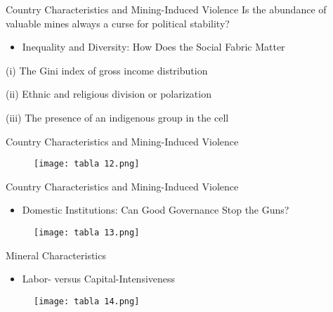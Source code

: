 \documentclass[pdftex,12pt,xcolor=pdftex,table]{beamer}
\theoremstyle{definition}
\theoremstyle{remark}
\numberwithin{equation}{section}
\numberwithin{figure}{section}
\begin{document}
    \begin{frame}{Country Characteristics and Mining-Induced Violence}
        \justifying
         Is the abundance of valuable mines always a curse for political stability?
        \begin{itemize}
          \item Inequality and Diversity: How Does the Social Fabric Matter
          \end{itemize}
          \vfill 
\item (i) The Gini index of gross income distribution
\item (ii) Ethnic and religious division or polarization
\item (iii) The presence of an indigenous group in the cell
          
    \end{frame}
    
    \begin{frame}{Country Characteristics and Mining-Induced Violence}
    \justifying
    \begin{figure}[H]
				\centering
				\texttt{[image: tabla 12.png]}
				
			\end{figure}
    
        \end{frame}
    
    \begin{frame}{Country Characteristics and Mining-Induced Violence}
        \justifying
        \begin{itemize}
        \item Domestic Institutions: Can Good Governance Stop the Guns?
        \end{itemize}
        \begin{figure}[H]
				\centering
				\texttt{[image: tabla 13.png]}
				
			\end{figure}
    
    
        \end{frame}
        
    \begin{frame}{Mineral Characteristics}
        \justifying
        \begin{itemize}
        \item Labor- versus Capital-Intensiveness
        \end{itemize}
        \begin{figure}[H]
				\centering
				\texttt{[image: tabla 14.png]}
				
			\end{figure}
    
         \end{frame}
         
\end{document}
